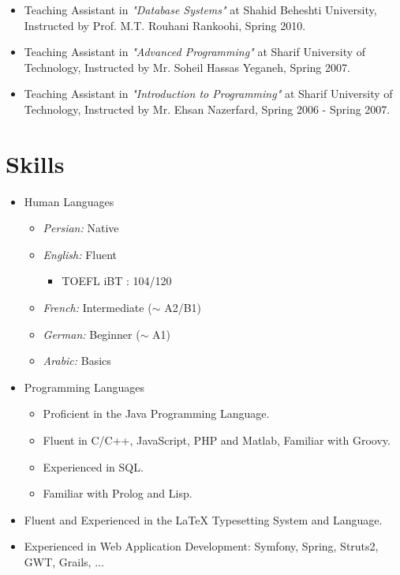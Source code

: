 \documentclass[a4paper]{article}
\theoremstyle{definition}
\begin{document}
\begin{itemize}
\begin{itemize}
	\item Teaching Assistant in \emph{"Database Systems"} at Shahid Beheshti University, Instructed by Prof. M.T. Rouhani Rankoohi, Spring 2010.
	\item Teaching Assistant in \emph{"Advanced Programming"} at Sharif University of Technology, Instructed by Mr. Soheil Hassas Yeganeh, Spring 2007.
	\item Teaching Assistant in \emph{"Introduction to Programming"} at Sharif University of Technology, Instructed by Mr. Ehsan Nazerfard, Spring 2006 - Spring 2007.
	
\end{itemize}
\end{itemize}
\section{Skills}
\begin{itemize}
\item Human Languages 
\begin{itemize}
\item \emph{Persian:} Native
\item \emph{English:} Fluent %
	\begin{itemize}
	\item TOEFL iBT : 104/120
	\end{itemize}
	
\item \emph{French:} Intermediate ($\sim$ A2/B1)
\item \emph{German:} Beginner ($\sim$ A1)
\item \emph{Arabic:} Basics
\end{itemize}
\item Programming Languages
\begin{itemize}
\item Proficient in the Java Programming Language.
\item Fluent in C/C++, JavaScript, PHP and Matlab, Familiar with Groovy.
\item Experienced in SQL.
\item Familiar with Prolog and Lisp.
\end{itemize}
\item Fluent and Experienced in the \LaTeX  \hspace*{1pt}  Typesetting System and Language.
\item Experienced in Web Application Development: Symfony, Spring, Struts2, GWT, Grails, $\ldots$

\end{itemize}
\end{document}
